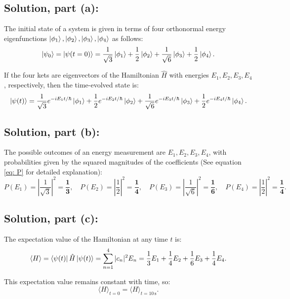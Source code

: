 \documentclass[12pt]{article}
\begin{document}
    \subsection{Solution, part (a):}
        The initial state of a system is given in terms of four orthonormal energy eigenfunctions \( \ket{\phi_1}, \ket{\phi_2}, \ket{\phi_3}, \ket{\phi_4} \) as follows:
        \[
            \ket{\psi_0} = \ket{\psi(t=0)} = \frac{1}{\sqrt{3}} \ket{\phi_1} + \frac{1}{2} \ket{\phi_2} + \frac{1}{\sqrt{6}} \ket{\phi_3} + \frac{1}{2} \ket{\phi_4}.
        \]


        If the four kets are eigenvectors of the Hamiltonian \( \hat{H} \) with energies \( E_1, E_2, E_3, E_4 \), respectively, then the time-evolved state is:
        \[
            \ket{\psi(t)} = \frac{1}{\sqrt{3}} e^{-iE_1 t/\hbar} \ket{\phi_1}
            + \frac{1}{2} e^{-iE_2 t/\hbar} \ket{\phi_2}
            + \frac{1}{\sqrt{6}} e^{-iE_3 t/\hbar} \ket{\phi_3}
            + \frac{1}{2} e^{-iE_4 t/\hbar} \ket{\phi_4}.
        \]
    
    \subsection{Solution, part (b):}
        The possible outcomes of an energy measurement are \( E_1, E_2, E_3, E_4 \), with probabilities given by the squared magnitudes of the coefficients (See equation \ref{eq: P} for detailed explanation):
        \[
            P(E_1) = \left| \frac{1}{\sqrt{3}} \right|^2 = \boldsymbol{\boxed{\frac{1}{3}}}, \quad
            P(E_2) = \left| \frac{1}{2} \right|^2 = \boldsymbol{\boxed{\frac{1}{4}}}, \quad
            P(E_3) = \left| \frac{1}{\sqrt{6}} \right|^2 = \boldsymbol{\boxed{\frac{1}{6}}}, \quad
            P(E_4) = \left| \frac{1}{2} \right|^2 = \boldsymbol{\boxed{\frac{1}{4}}}.
        \]

    \subsection{Solution, part (c):}
        The expectation value of the Hamiltonian at any time \( t \) is:
        \[
            \langle H \rangle = \bra{\psi(t)} \hat{H} \ket{\psi(t)} = \sum_{n=1}^{4} |c_n|^2 E_n
            = \frac{1}{3} E_1 + \frac{1}{4} E_2 + \frac{1}{6} E_3 + \frac{1}{4} E_4.
        \]

        This expectation value remains constant with time, so:
        \[
        \langle H \rangle_{t=0} = \langle H \rangle_{t=10\,\text{s}}.
        \]
\end{document}
